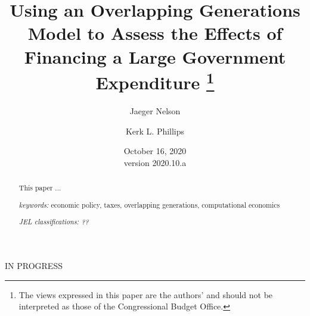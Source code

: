 \documentclass[letterpaper,12pt]{article}
\numberwithin{equation}{section}
\numberwithin{figure}{section}
\numberwithin{table}{section}
\begin{document}
\begin{titlepage}
	\title{Using an Overlapping Generations Model to Assess the Effects of Financing a Large Government Expenditure
	\thanks{The views expressed in this paper are the authors' and should not be interpreted as those of the Congressional Budget Office.}}

    \author[1]{Jaeger Nelson}
	\author[1]{Kerk L. Phillips}


	\date{October 16, 2020\\
	\small{version 2020.10.a}}
	
	\maketitle

	\vspace{-0.3 in}
	\begin{abstract}
	\small{
	This paper ... 

	\vspace{0.1 in}

	\textit{keywords:} economic policy, taxes, overlapping generations, computational economics

	\vspace{0.1 in}

	\textit{JEL classifications: ??} }
	\end{abstract}

	\centering
	IN PROGRESS
	\thispagestyle{empty}
\end{titlepage}
\end{document}
